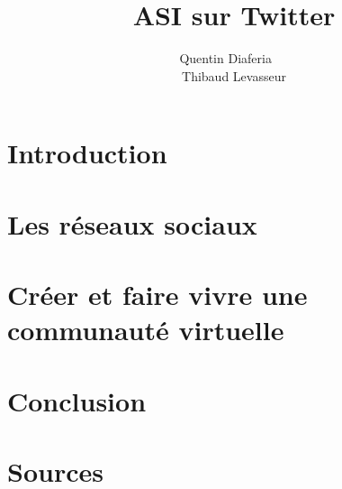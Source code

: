 \documentclass[a4paper,12pt]{article}
\title{ASI sur Twitter}
\author{Quentin Diaferia ~~\\ Thibaud Levasseur}
\begin{document}
\maketitle
\newpage
\tableofcontents
\newpage
\section{Introduction}

\newpage
\section{Les réseaux sociaux}

\newpage
\section{Créer et faire vivre une communauté virtuelle}

\newpage
\section{Conclusion}
\newpage
\section{Sources}

\end{document}
